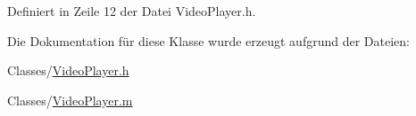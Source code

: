 Definiert in Zeile 12 der Datei VideoPlayer.h.

Die Dokumentation für diese Klasse wurde erzeugt aufgrund der Dateien:\begin{DoxyCompactItemize}
\item 
Classes/\hyperlink{_video_player_8h}{VideoPlayer.h}\item 
Classes/\hyperlink{_video_player_8m}{VideoPlayer.m}\end{DoxyCompactItemize}
